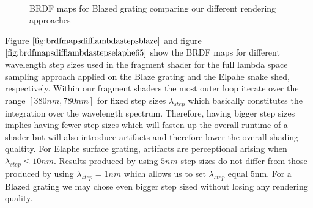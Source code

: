 \begin{figure}[H]
  \centering
~
~
~
    
\caption{BRDF maps for Blazed grating comparing our different rendering approaches}
\label{fig:brdfmapsdiffrenderingapproaches}
\end{figure}

Figure $\ref{fig:brdfmapsdifflambdastepsblaze}$ and figure $\ref{fig:brdfmapsdifflambdastepselaphe65}$ show the BRDF maps for different wavelength step sizes used in the fragment shader for the full lambda space sampling approach applied on the Blaze grating and the Elpahe snake shed, respectively. Within our fragment shaders the most outer loop iterate over the range $[380nm, 780nm]$ for fixed step sizes $\lambda_{step}$ which basically constitutes the integration over the wavelength spectrum. Therefore, having bigger step sizes implies having fewer step sizes which will fasten up the overall runtime of a shader but will also introduce artifacts and therefore lower the overall shading qualtity. For Elaphe surface grating, artifacts are perceptional arising when $\lambda_{step} \leq 10nm$. Results produced by using $5nm$ step sizes do not differ from those produced by using $\lambda_{step}= 1nm$ which allows us to set $\lambda_{step}$ equal 5nm. For a Blazed grating we may chose even bigger step sized without losing any rendering quality.   

